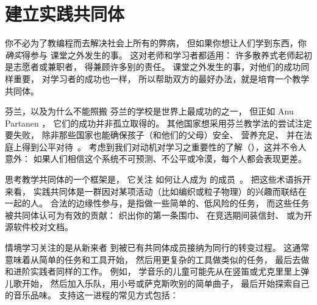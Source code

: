 \chapter{建立实践共同体}\label{s:community}

你不必为了教编程而去解决社会上所有的弊病，
但如果你想让人们学到东西，你\emph{确实}得参与
课堂之外发生的事。
这对老师和学习者都适用：
许多散养式老师起初是志愿者或兼职者，
得兼顾许多别的责任。
课堂之外发生的事，对他们的成功同样重要，
对学习者的成功也一样，
所以帮助双方的最好办法，就是培育一个教学共同体。

\begin{aside}{芬兰，以及为什么不能照搬}
  芬兰的学校是世界上最成功的之一，
  但正如 Anu Partanen
  ，
  它们的成功并非孤立取得的。
  其他国家想采用芬兰教学法的尝试注定要失败，
  除非那些国家也能确保孩子（和他们的父母）安全、
  营养充足、
  并在法庭上得到公平对待~\cite{Sahl2015,Wilk2011}。
  考虑到我们对动机对学习之重要性的了解（），这并不令人意外：
  如果人们相信这个系统不可预测、不公平或冷漠，每个人都会表现更差。
\end{aside}

思考教学共同体的一个框架是，
它关注
如何让人成为
的成员~\cite{Weng2015}。
把这些术语拆开来看，
实践共同体是一群因对某项活动（比如编织或粒子物理）的兴趣而联结在一起的人。
合法的边缘性参与，是指做一些简单的、低风险的任务，
而这些任务被共同体认可为有效的贡献：
织出你的第一条围巾、
在竞选期间装信封、
或为开源软件校对文档。

情境学习关注的是从新来者
到被已有共同体成员接纳为同行的转变过程。
这通常意味着从简单的任务和工具开始，
然后用更复杂的工具做类似的任务，
最后去做和进阶实践者同样的工作。
例如，
学音乐的儿童可能先从在竖笛或尤克里里上弹儿歌开始，
然后加入乐队，用小号或萨克斯吹别的简单曲子，
最后开始探索自己的音乐品味。
支持这一进程的常见方式包括：

